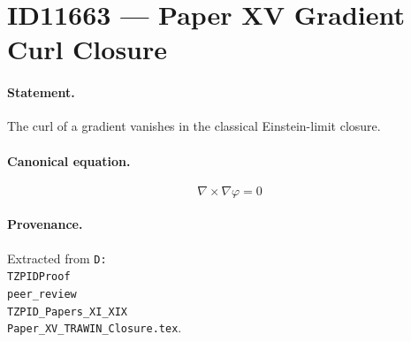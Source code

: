 \section*{ID11663 --- Paper XV Gradient Curl Closure}

\paragraph{Statement.}
The curl of a gradient vanishes in the classical Einstein-limit closure.

\paragraph{Canonical equation.}
\[
\nabla\times\nabla\varphi=0
\]

\paragraph{Provenance.}
Extracted from \texttt{D:\\TZPIDProof\\peer\_review\\TZPID\_Papers\_XI\_XIX\\Paper\_XV\_TRAWIN\_Closure.tex}.
